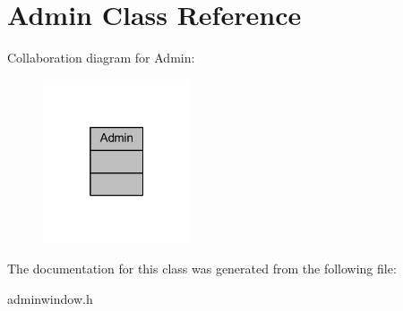 \hypertarget{class_admin}{}\section{Admin Class Reference}
\label{class_admin}


Collaboration diagram for Admin\+:\nopagebreak
\begin{figure}[H]
\begin{center}
\leavevmode
\includegraphics[width=124pt]{class_admin__coll__graph}
\end{center}
\end{figure}


The documentation for this class was generated from the following file\+:\begin{DoxyCompactItemize}
\item 
adminwindow.\+h\end{DoxyCompactItemize}
